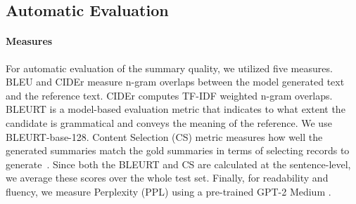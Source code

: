 
\subsection{Automatic Evaluation}

\paragraph{Measures} For automatic evaluation of the summary quality, we utilized five measures. BLEU \cite{post-2018-call} and CIDEr \cite{vedantam2015cider} measure n-gram overlaps between the model generated text and the reference text. CIDEr computes TF-IDF weighted n-gram overlaps. BLEURT \cite{sellam2020bleurt} is a model-based evaluation metric that indicates to what extent the candidate is grammatical and conveys the meaning of the reference. We use BLEURT-base-128.    
Content Selection (CS) metric   measures how well the generated summaries match the gold summaries in terms of selecting records to generate~\cite{wiseman2017challenges}. Since both the BLEURT and CS are calculated at the sentence-level, we 
average these scores over the whole test set.
Finally, for 
readability and fluency, we measure Perplexity (PPL) using a pre-trained  GPT-2 Medium \cite{radford2019language}. 


